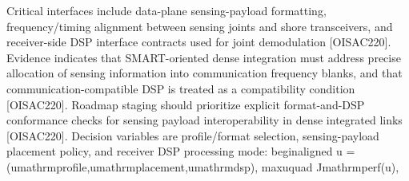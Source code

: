 {} Critical interfaces include data-plane sensing-payload formatting, frequency/timing alignment between sensing joints and shore transceivers, and receiver-side DSP interface contracts used for joint demodulation [O\markdownRendererUnderscore{}ISAC\markdownRendererUnderscore{}220].\markdownRendererParagraphSeparator
{} Evidence indicates that SMART-oriented dense integration must address precise allocation of sensing information into communication frequency blanks, and that communication-compatible DSP is treated as a compatibility condition [O\markdownRendererUnderscore{}ISAC\markdownRendererUnderscore{}220].\markdownRendererParagraphSeparator
{} Roadmap staging should prioritize explicit format-and-DSP conformance checks for sensing payload interoperability in dense integrated links [O\markdownRendererUnderscore{}ISAC\markdownRendererUnderscore{}220].\markdownRendererInterblockSeparator
{}
\markdownRendererSectionEnd \markdownRendererSectionBegin
{}\markdownRendererInterblockSeparator
{}Decision variables are profile/format selection, sensing-payload placement policy, and receiver DSP processing mode:\markdownRendererParagraphSeparator
{}\markdownRendererDollarSign{}\markdownRendererDollarSign{}\markdownRendererSoftLineBreak
{}\markdownRendererBackslash{}begin\markdownRendererLeftBrace{}aligned\markdownRendererRightBrace{}\markdownRendererSoftLineBreak
{}u \markdownRendererAmpersand{}= (u\markdownRendererUnderscore{}\markdownRendererLeftBrace{}\markdownRendererBackslash{}mathrm\markdownRendererLeftBrace{}profile\markdownRendererRightBrace{}\markdownRendererRightBrace{},u\markdownRendererUnderscore{}\markdownRendererLeftBrace{}\markdownRendererBackslash{}mathrm\markdownRendererLeftBrace{}placement\markdownRendererRightBrace{}\markdownRendererRightBrace{},u\markdownRendererUnderscore{}\markdownRendererLeftBrace{}\markdownRendererBackslash{}mathrm\markdownRendererLeftBrace{}dsp\markdownRendererRightBrace{}\markdownRendererRightBrace{}),\markdownRendererBackslash{}\markdownRendererSoftLineBreak
{}\markdownRendererBackslash{}max\markdownRendererUnderscore{}\markdownRendererLeftBrace{}u\markdownRendererRightBrace{}\markdownRendererBackslash{}quad \markdownRendererAmpersand{} J\markdownRendererUnderscore{}\markdownRendererLeftBrace{}\markdownRendererBackslash{}mathrm\markdownRendererLeftBrace{}perf\markdownRendererRightBrace{}\markdownRendererRightBrace{}(u),\markdownRendererBackslash{}\markdownRendererSoftLineBreak
